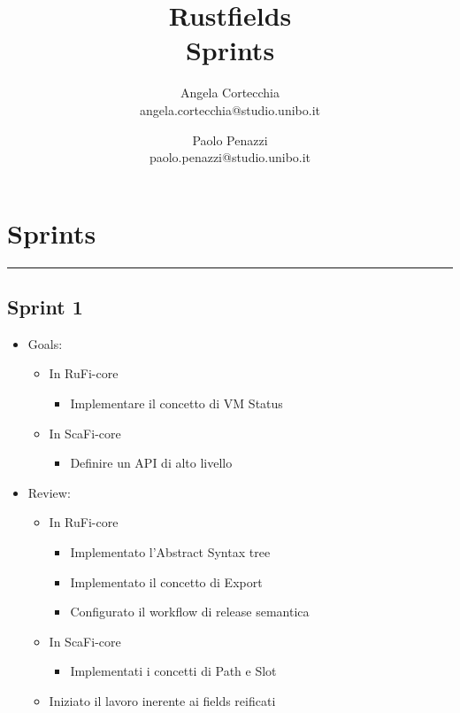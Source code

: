 \documentclass[12pt, a4paper]{article}
\title{\LARGE
    Rustfields \\ 
    \small
    Sprints
    }
\author{
    Angela Cortecchia \\ 
    \small 
    angela.cortecchia@studio.unibo.it
    \and
    Paolo Penazzi \\ 
    \small
    paolo.penazzi@studio.unibo.it
}
\date{\small }
\begin{document}
\maketitle
\newpage

\section*{Sprints}

\par\noindent\rule{\textwidth}{0.5pt}

\subsection*{Sprint 1}

\begin{itemize}
    \item Goals:
          \begin{itemize}
              \item In RuFi-core
                    \begin{itemize}
                        \item Implementare il concetto di VM Status
                    \end{itemize}
              \item In ScaFi-core
                    \begin{itemize}
                        \item Definire un API di alto livello
                    \end{itemize}
          \end{itemize}
    \item Review:
          \begin{itemize}
              \item In RuFi-core
                    \begin{itemize}
                        \item Implementato l'Abstract Syntax tree
                        \item Implementato il concetto di Export
                        \item Configurato il workflow di release semantica
                    \end{itemize}
              \item In ScaFi-core
                    \begin{itemize}
                        \item Implementati i concetti di Path e Slot
                    \end{itemize}
              \item Iniziato il lavoro inerente ai fields reificati
          \end{itemize}
\end{itemize}
\end{document}
